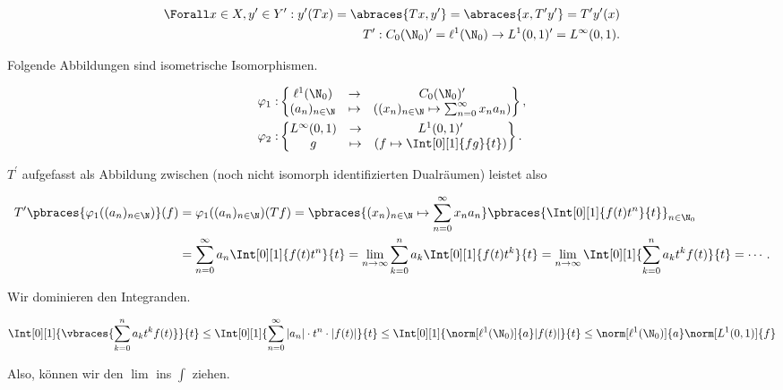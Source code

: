 \begin{solution}
\begin{align*}
  \Forall x \in X, y^\prime \in Y^\prime:
  y^\prime(T x)
  =
  \abraces{T x, y^\prime}
  =
  \abraces{x, T^\prime y^\prime}
  =
  T^\prime y^\prime(x) \\
  \quad
  T^\prime:
  C_0(\N_0)^\prime = \ell^1(\N_0)
  \to
  L^1(0, 1)^\prime = L^\infty(0, 1).
\end{align*}

Folgende Abbildungen sind isometrische Isomorphismen.

\begin{align*}
  \varphi_1:
  &
  \begin{Bmatrix}
    \ell^1(\N_0)        & \to     & C_0(\N_0)^\prime \\
    (a_n)_{n \in \N} & \mapsto &
    ((x_n)_{n \in \N} \mapsto \sum_{n=0}^\infty x_n a_n)
  \end{Bmatrix}, \\
  \varphi_2:
  &
  \begin{Bmatrix}
    L^\infty(0, 1) & \to    & L^1(0, 1)^\prime \\
    g              &\mapsto & (f \mapsto \Int[0][1]{fg}{t})
  \end{Bmatrix}.
\end{align*}

$T^\prime$ aufgefasst als Abbildung zwischen (noch nicht isomorph identifizierten Dualräumen) leistet also

\begin{align*}
  T^\prime \pbraces
  {
    \varphi_1((a_n)_{n \in \N})
  }(f)
  & =
  \varphi_1((a_n)_{n \in \N})(T f)
  =
  \pbraces{(x_n)_{n \in \N} \mapsto \sum_{n=0}^\infty x_n a_n}
  \pbraces{\Int[0][1]{f(t) t^n}{t}}_{n \in \N_0} \\
  & =
  \sum_{n=0}^\infty a_n
  \Int[0][1]{f(t) t^n}{t}
  =
  \lim_{n \to \infty} \sum_{k= 0}^n a_k
  \Int[0][1]{f(t) t^k}{t}
  =
  \lim_{n \to \infty}
  \Int[0][1]{\sum_{k=0}^n a_k t^k f(t)}{t} = \cdots.
\end{align*}

Wir dominieren den Integranden.

\begin{align*}
  \Int[0][1]
  {
    \vbraces
    {
      \sum_{k=0}^n a_k t^k f(t)
    }
  }
  {t}
  \leq
  \Int[0][1]{\sum_{n=0}^\infty |a_n| \cdot t^n \cdot |f(t)|}{t}
  \leq
  \Int[0][1]{\norm[\ell^1(\N_0)]{a} |f(t)|}{t}
  \leq
  \norm[\ell^1(\N_0)]{a} \norm[L^1(0, 1)]{f}
\end{align*}

Also, können wir den $\lim$ ins $\int$ ziehen.


\end{solution}
